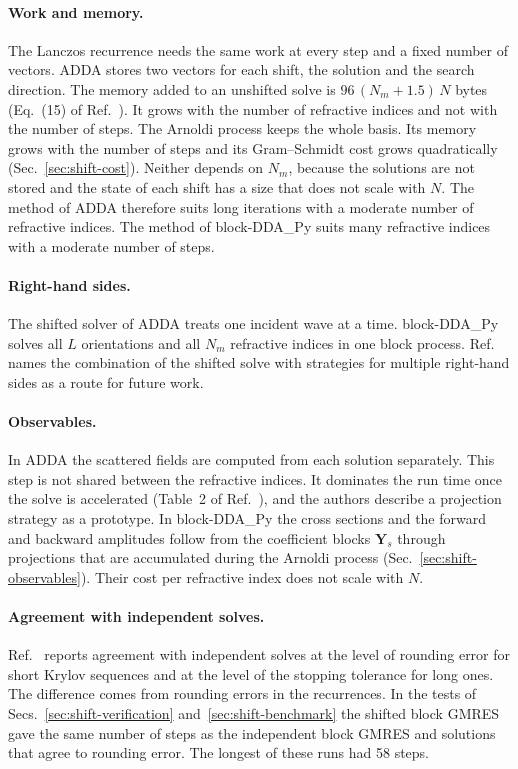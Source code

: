 \documentclass[11pt,a4paper]{article}
\begin{document}
\paragraph{Work and memory.}
The Lanczos recurrence needs the same work at every step and a fixed
number of vectors.
ADDA stores two vectors for each shift, the solution and the search
direction.
The memory added to an unshifted solve is $96\,(N_m + 1.5)\,N$ bytes
(Eq.~(15) of Ref.~\cite{Argentin2026}).
It grows with the number of refractive indices and not with the number
of steps.
The Arnoldi process keeps the whole basis.
Its memory grows with the number of steps and its Gram--Schmidt cost
grows quadratically (Sec.~\ref{sec:shift-cost}).
Neither depends on $N_m$, because the solutions are not stored and the
state of each shift has a size that does not scale with $N$.
The method of ADDA therefore suits long iterations with a moderate
number of refractive indices.
The method of block-DDA\_Py suits many refractive indices with a
moderate number of steps.

\paragraph{Right-hand sides.}
The shifted solver of ADDA treats one incident wave at a time.
block-DDA\_Py solves all $L$ orientations and all $N_m$ refractive
indices in one block process.
Ref.~\cite{Argentin2026} names the combination of the shifted solve
with strategies for multiple right-hand sides as a route for future
work.

\paragraph{Observables.}
In ADDA the scattered fields are computed from each solution
separately.
This step is not shared between the refractive indices.
It dominates the run time once the solve is accelerated
(Table~2 of Ref.~\cite{Argentin2026}), and the authors describe a
projection strategy as a prototype.
In block-DDA\_Py the cross sections and the forward and backward
amplitudes follow from the coefficient blocks $\mathbf{Y}_s$ through
projections that are accumulated during the Arnoldi process
(Sec.~\ref{sec:shift-observables}).
Their cost per refractive index does not scale with $N$.

\paragraph{Agreement with independent solves.}
Ref.~\cite{Argentin2026} reports agreement with independent solves at
the level of rounding error for short Krylov sequences and at the level
of the stopping tolerance for long ones.
The difference comes from rounding errors in the recurrences.
In the tests of Secs.~\ref{sec:shift-verification}
and~\ref{sec:shift-benchmark} the shifted block GMRES gave the same
number of steps as the independent block GMRES and solutions that agree
to rounding error.
The longest of these runs had 58 steps.
\end{document}
